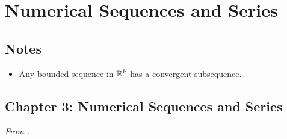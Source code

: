\documentclass[../../notes.tex]{subfiles}
\begin{document}
\chapter{Numerical Sequences and Series}
\section{Notes}
\begin{itemize}
    \item {}Any bounded sequence in $\mathbb{R}^k$ has a convergent subsequence.
\end{itemize}



\section{Chapter 3: Numerical Sequences and Series}
\emph{From \textcite{bib:Rudin}.}
\end{document}
